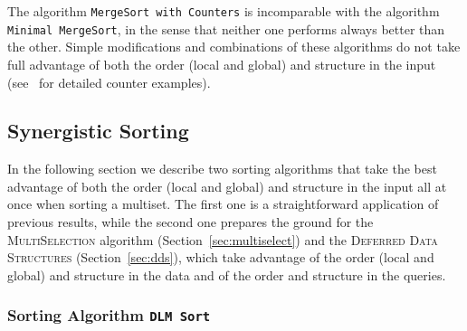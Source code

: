 The algorithm \texttt{MergeSort with Counters} is incomparable with
the algorithm \texttt{Minimal MergeSort}, in the sense that neither
one performs always better than the other. Simple modifications and
combinations of these algorithms do not take full advantage of both
the order (local and global) and structure in the input
(see~\cite{2016-ARXIV-SynergisticSortingAndDeferredDataStructuresOnMultiSets-BarbayOchoaSatty}
for detailed counter examples).

\subsection{Synergistic Sorting}
\label{sec:syn-sort}

In the following section we describe two sorting algorithms that take
the best advantage of both the order (local and global) and structure
in the input all at once when sorting a multiset. The first one is a
straightforward application of previous results, while the second one
prepares the ground for the \textsc{MultiSelection} algorithm
(Section~\ref{sec:multiselect}) and the \textsc{Deferred Data
  Structures} (Section~\ref{sec:dds}), which take
advantage of the order (local and global) and structure in the data
and of the order and structure in the queries.

\subsubsection{Sorting Algorithm \texttt{DLM
    Sort}}
\label{sec:dlm-sort}

